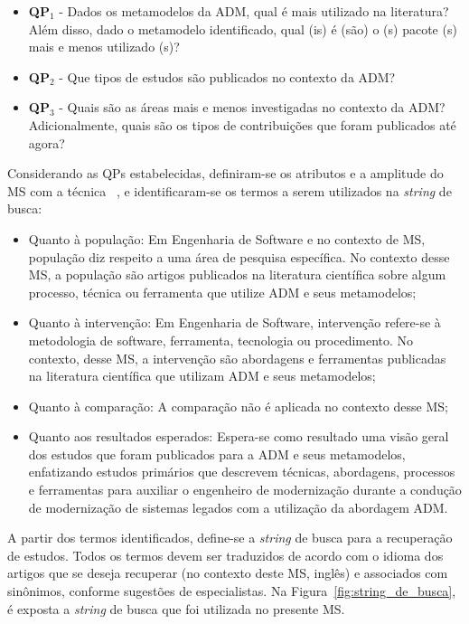 \begin{itemize}
\item \textbf{QP$_1$} - Dados os metamodelos da ADM, qual é mais utilizado na literatura? Além disso, dado o metamodelo identificado, qual (is) é (são) o (s) pacote (s) mais e menos utilizado (s)?
\item \textbf{QP$_2$} - Que tipos de estudos são publicados no contexto da ADM?
\item \textbf{QP$_3$} - Quais são as áreas mais e menos investigadas no contexto da ADM? Adicionalmente, quais são os tipos de contribuições que foram publicados até agora?
\end{itemize}

Considerando as QPs estabelecidas, definiram-se os atributos e a amplitude do MS com a técnica ~\cite{Kitchenham_2010}, e identificaram-se os termos a serem utilizados na \textit{string} de busca:

\begin{itemize}
\item Quanto à população: Em Engenharia de Software e no contexto de MS, população diz respeito a uma área de pesquisa específica. No contexto desse MS, a população são artigos publicados na literatura científica sobre algum processo, técnica ou ferramenta que utilize ADM e seus metamodelos;

\item Quanto à intervenção: Em Engenharia de Software, intervenção refere-se à metodologia de software, ferramenta, tecnologia ou procedimento. No contexto, desse MS, a intervenção são abordagens e ferramentas publicadas na literatura científica que utilizam ADM e seus metamodelos;

\item Quanto à comparação: A comparação não é aplicada no contexto desse MS;

\item Quanto aos resultados esperados: Espera-se como resultado uma visão geral dos estudos que foram publicados para a ADM e seus metamodelos, enfatizando estudos primários que descrevem técnicas, abordagens, processos e ferramentas para auxiliar o engenheiro de modernização durante a condução de modernização de sistemas legados com a utilização da abordagem ADM.

\end{itemize}

A partir dos termos identificados, define-se a \textit{string} de busca para a recuperação de estudos. Todos os termos devem ser traduzidos de acordo com o idioma dos artigos que se deseja recuperar (no contexto deste MS, inglês) e associados com sinônimos, conforme sugestões de especialistas. Na Figura~\ref{fig:string_de_busca}, é exposta a \textit{string} de busca que foi utilizada no presente MS.


